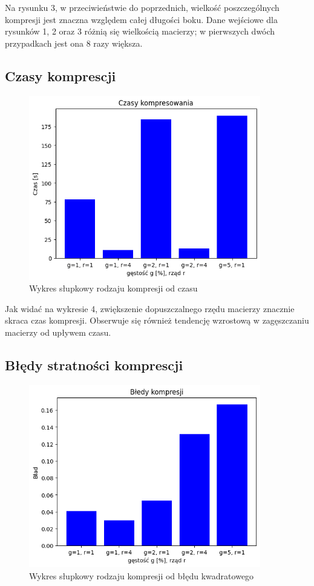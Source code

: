 \documentclass{article}
\begin{document}
Na rysunku 3, w przeciwieństwie do poprzednich, wielkość poszczególnych kompresji jest znaczna względem całej długości boku. Dane wejściowe dla rysunków 1, 2 oraz 3 różnią się wielkością macierzy; w pierwszych dwóch przypadkach jest ona 8 razy większa.

\FloatBarrier
\subsection{Czasy komprescji}

\begin{figure}
  \centering
  \includegraphics[width=0.9\textwidth]{img/czasy.png}
  \caption{Wykres słupkowy rodzaju kompresji od czasu}
\end{figure}


Jak widać na wykresie 4, zwiększenie dopuszczalnego rzędu macierzy znacznie 
skraca czas kompresji.
 Obserwuje się również tendencję wzrostową w zagęszczaniu macierzy od upływem czasu.

\FloatBarrier
\subsection{Błędy stratności komprescji}
\begin{figure}
  \centering
  \includegraphics[width=0.9\textwidth]{img/bledy.png}
  \caption{Wykres słupkowy rodzaju kompresji od błędu kwadratowego}
\end{figure}
\end{document}
